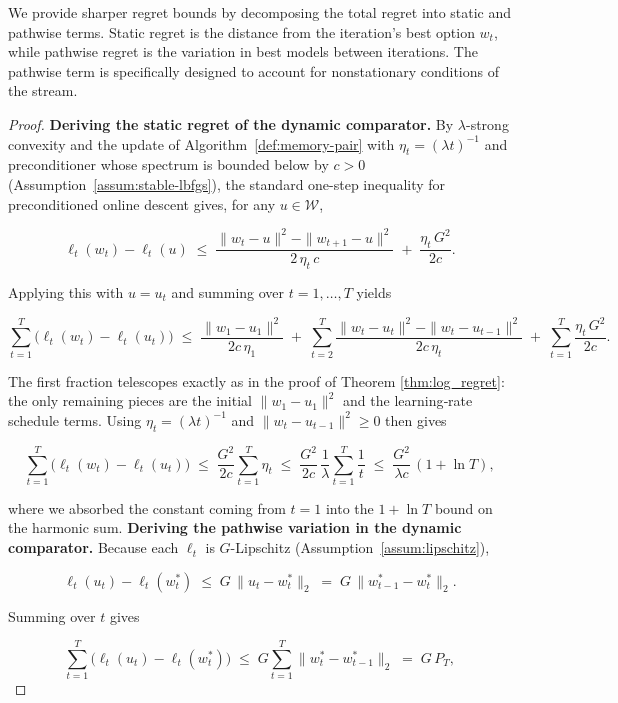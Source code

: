 \documentclass{article}
\theoremstyle{ssltheorem}
\begin{document}
We provide sharper regret bounds by decomposing the total regret into static and pathwise terms.
Static regret is the distance from the iteration's best option $w_{t}$, while pathwise regret is the variation in best models between iterations.
The pathwise term is specifically designed to account for nonstationary conditions of the stream.
\begin{proof}
\textbf{Deriving the static regret of the dynamic comparator.}
By $\lambda$-strong convexity and the update of Algorithm~\ref{def:memory-pair} with
$\eta_{t} = (\lambda t)^{-1}$ and preconditioner whose spectrum is bounded below by $c>0$ (Assumption~\ref{assum:stable-lbfgs}), the standard one-step inequality for preconditioned online descent gives, for any $u\in\mathcal{W}$,

$$
  \ell_{t}(w_{t})-\ell_{t}(u)
  \;\le\;
\frac{\|w_{t}-u\|^{2}-\|w_{t+1}-u\|^{2}}{2\,\eta_{t}\,c}
  \;+\;
  \frac{\eta_{t}\,G^{2}}{2c}.
$$

Applying this with $u=u_{t}$ and summing over $t=1,\dots,T$ yields

$$
  \sum_{t=1}^{T}\bigl(\ell_{t}(w_{t})-\ell_{t}(u_{t})\bigr)
  \;\le\;
  \frac{\|w_{1}-u_{1}\|^{2}}{2c\,\eta_{1}}
  \;+\;
\sum_{t=2}^{T}\frac{\|w_{t}-u_{t}\|^{2}-\|w_{t}-u_{t-1}\|^{2}}{2c\,\eta_{t}}
  \;+\;
  \sum_{t=1}^{T}\frac{\eta_{t}\,G^{2}}{2c}.
$$

The first fraction telescopes exactly as in the proof of Theorem \ref{thm:log_regret}: the only remaining pieces are the initial $\|w_{1}-u_{1}\|^{2}$ and the learning‑rate schedule terms.
Using $\eta_{t}=(\lambda t)^{-1}$ and $\|w_{t}-u_{t-1}\|^{2}\ge 0$ then gives

$$
  \sum_{t=1}^{T}\bigl(\ell_{t}(w_{t})-\ell_{t}(u_{t})\bigr)
  \;\le\;
  \frac{G^{2}}{2c}\sum_{t=1}^{T}\eta_{t}
  \;\le\;
  \frac{G^{2}}{2c}\,\frac{1}{\lambda}\sum_{t=1}^{T}\frac{1}{t}
  \;\le\;
\frac{G^{2}}{\lambda c}\,(1+\ln T),
$$

where we absorbed the constant coming from $t=1$ into the $1+\ln T$ bound on the harmonic sum.
\textbf{Deriving the pathwise variation in the dynamic comparator.}
Because each $\ell_{t}$ is $G$-Lipschitz (Assumption~\ref{assum:lipschitz}),

$$
  \ell_{t}(u_{t})-\ell_{t}(w_{t}^{*})
  \;\le\;
  G\,\|u_{t}-w_{t}^{*}\|_{2}
  \;=\;
G\,\|w_{t-1}^{*}-w_{t}^{*}\|_{2}.
$$

Summing over $t$ gives

$$
  \sum_{t=1}^{T}\bigl(\ell_{t}(u_{t})-\ell_{t}(w_{t}^{*})\bigr)
  \;\le\;
  G\sum_{t=1}^{T}\|w_{t}^{*}-w_{t-1}^{*}\|_{2}
  \;=\;
G\,P_{T},
$$


\end{proof}
\end{document}
